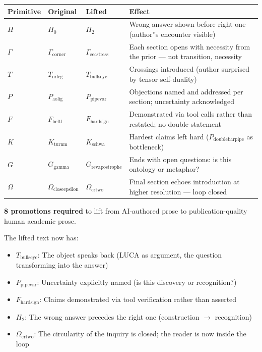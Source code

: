 \documentclass[12pt,a4paper]{article}
\begin{document}
\begin{table}[htbp]
\centering
\small
{}
\begin{tabularx}{\textwidth}{>{\centering\arraybackslash}X >{\centering\arraybackslash}X >{\centering\arraybackslash}X >{\centering\arraybackslash}X}
\toprule
\rowcolor{gray!25}\textbf{Primitive} & \textbf{Original} & \textbf{Lifted} & \textbf{Effect} \\
\midrule
\rowcolors{1}{white}{gray!10}
$H$ & $H_0$ & $H_2$ & Wrong answer shown before right one (author''s encounter visible) \\
$\Gamma$ & $\Gamma_{\text{corner}}$ & $\Gamma_{\text{secstress}}$ & Each section opens with necessity from the prior --- not transition, necessity \\
$T$ & $T_{\text{nrleg}}$ & $T_{\text{bullseye}}$ & Crossings introduced (author surprised by tensor self-duality) \\
$P$ & $P_{\text{aolig}}$ & $P_{\text{pipevar}}$ & Objections named and addressed per section; uncertainty acknowledged \\
$F$ & $F_{\text{beltl}}$ & $F_{\text{hardsign}}$ & Demonstrated via tool calls rather than restated; no double-statement \\
$K$ & $K_{\text{turnm}}$ & $K_{\text{schwa}}$ & Hardest claims left hard ($P_{\text{doublebarpipe}}$ as bottleneck) \\
$G$ & $G_{\text{gamma}}$ & $G_{\text{revapostrophe}}$ & Ends with open questions: is this ontology or metaphor? \\
$\Omega$ & $\Omega_{\text{closeepsilon}}$ & $\Omega_{\text{crtwo}}$ & Final section echoes introduction at higher resolution --- loop closed \\
\bottomrule
\end{tabularx}
\end{table}

\textbf{8 promotions required} to lift from AI-authored prose to publication-quality human academic prose.

The lifted text now has:

\begin{itemize}
    \item \textbf{$T_{\text{bullseye}}$}: The object speaks back (LUCA as argument, the question transforming into the answer)
    \item \textbf{$P_{\text{pipevar}}$}: Uncertainty explicitly named (is this discovery or recognition?)
    \item \textbf{$F_{\text{hardsign}}$}: Claims demonstrated via tool verification rather than asserted
    \item \textbf{$H_2$}: The wrong answer precedes the right one (construction $\rightarrow$ recognition)
    \item \textbf{$\Omega_{\text{crtwo}}$}: The circularity of the inquiry is closed; the reader is now inside the loop
\end{itemize}
\end{document}
